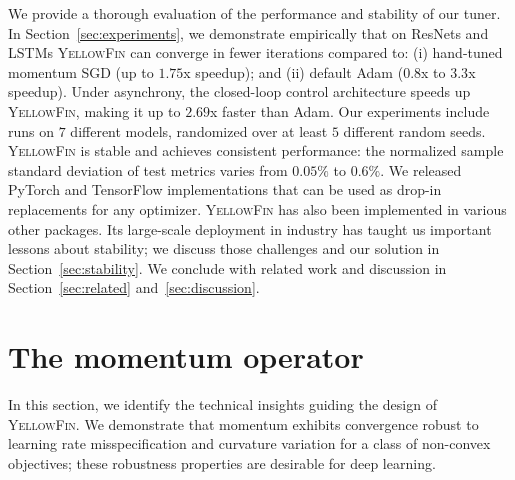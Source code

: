 \documentclass{article} %
\newcommand{\tuner}{\textsc{YellowFin}\xspace}
\newcommand{\yell}[1]{#1}
\begin{document}
We provide a thorough evaluation of the performance and stability of our tuner.
In Section~\ref{sec:experiments}, we demonstrate empirically that \yell{on ResNets and LSTMs}
\tuner can converge in fewer iterations compared to:
(i) hand-tuned momentum SGD (up to $1.75$x speedup);
and (ii) default Adam ($0.8$x to $3.3$x speedup).
Under asynchrony, the closed-loop control architecture speeds up \tuner, 
making it up to $2.69$x faster than Adam. 
Our experiments include runs on $7$ different models, randomized over at least $5$ different random seeds. 
\tuner is stable and achieves consistent performance: the normalized sample standard deviation of test metrics varies from $0.05\%$ to $0.6\%$.
We released PyTorch and TensorFlow implementations that can be used as drop-in replacements for any optimizer.
\tuner has also been implemented in various other packages.
Its large-scale deployment in industry has taught us important lessons about stability; we discuss those challenges and our solution in Section~\ref{sec:stability}.
We conclude with related work and discussion in Section~\ref{sec:related} and~\ref{sec:discussion}.



\section{The momentum operator}
\label{sec:momentum_operator}

\newcommand{\gc}{generalized curvature\xspace}
\newcommand{\Gc}{Generalized curvature\xspace}
\vspace{-0.25em}
In this section, we identify the technical insights guiding the design of \tuner. 
We demonstrate that momentum exhibits convergence robust to learning rate misspecification and 
curvature variation for a class of non-convex objectives; these robustness properties are desirable for deep learning.
\end{document}
